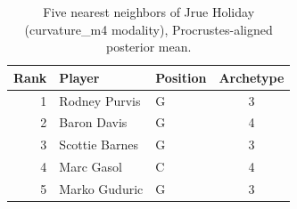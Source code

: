 \begin{table}[htbp]
  \centering\small
  \begin{tabular}{rllc}
    \toprule
    Rank & Player & Position & Archetype \\
    \midrule
    1 & Rodney Purvis & G & 3 \\
    2 & Baron Davis & G & 4 \\
    3 & Scottie Barnes & G & 3 \\
    4 & Marc Gasol & C & 4 \\
    5 & Marko Guduric & G & 3 \\
    \bottomrule
  \end{tabular}
  \caption{Five nearest neighbors of Jrue Holiday (curvature_m4 modality), Procrustes-aligned posterior mean.}
  \label{tab:Jrue_Holiday_neighbors_curvature_m4}
\end{table}

